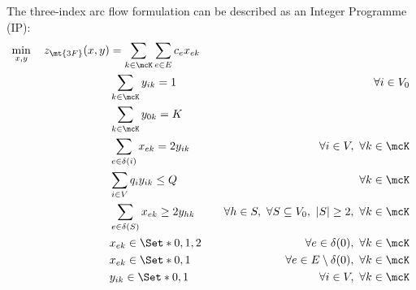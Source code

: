 The three-index arc flow formulation can be described as an Integer Programme (IP):
\begin{align}
	\min_{x, y} \quad z_\mt{3F}(x, y) & = \sum_{k \in \mcK} \sum_{e \in E} c_{e} x_{ek} \label{eq:three-index-flow-obj-func}                                                                                                                           \\
	                                  & \sum_{k \in \mcK} y_{ik} = 1                                                         & \quad \forall i \in V_0                                              \label{eq:three-index-flow-all-customers-visited}  \\
	                                  & \sum_{k \in \mcK} y_{0k} = K                                                         & \label{eq:three-index-flow-tour-starts-and-ends-at-depot}                                                               \\
	                                  & \sum_{e \in \delta(i)} x_{ek} = 2 y_{ik}                                             & \quad \forall i \in V,\ \forall k \in \mcK \label{eq:three-index-flow-force-visited-customer-if-flow}                   \\
	                                  & \sum_{i \in V} q_i y_{ik} \le Q                                                      & \quad \forall k \in \mcK \label{eq:three-index-flow-force-resource-upper-bound}                                         \\
	                                  & \sum_{e \in \delta(S)} x_{ek} \ge 2 y_{hk}                                           & \quad \forall h \in S,\ \forall S \subseteq V_0,\ |S| \ge 2,\ \forall k \in \mcK \label{eq:three-index-flow-secv1}      \\
	                                  & x_{ek}                   \in \Set*{0, 1, 2}                                          & \quad \forall e \in \delta(0),\ \forall k \in \mcK             \label{eq:three-index-flow-x-mip-var-bounds-depot}       \\
	                                  & x_{ek}                   \in \Set*{0, 1}                                             & \quad \forall e \in E \setminus \delta(0),\ \forall k \in \mcK             \label{eq:three-index-flow-x-mip-var-bounds} \\
	                                  & y_{ik}                    \in \Set*{0, 1}                                            & \quad \forall i \in V,\ \forall k \in \mcK  \label{eq:three-index-flow-y-mip-var-bounds}
\end{align}
